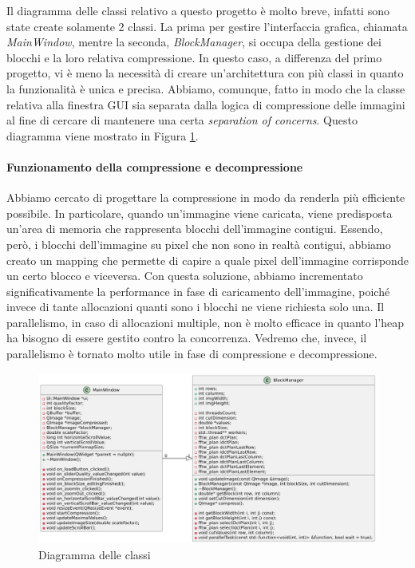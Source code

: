 Il diagramma delle classi relativo a questo progetto è molto breve, infatti sono state create solamente 2 classi. La prima per gestire l'interfaccia grafica, chiamata \textit{MainWindow}, mentre la seconda, \textit{BlockManager}, si occupa della gestione dei blocchi e la loro relativa compressione. In questo caso, a differenza del primo progetto, vi è meno la necessità di creare  un'architettura con più classi in quanto la funzionalità è unica e precisa. Abbiamo, comunque, fatto in modo che la classe relativa alla finestra GUI sia separata dalla logica di compressione delle immagini al fine di cercare di mantenere una certa \textit{separation of concerns}. Questo diagramma viene mostrato in Figura \ref{fig:class_diagram}.

\paragraph{Funzionamento della compressione e decompressione}
Abbiamo cercato di progettare la compressione in modo da renderla più efficiente possibile. In particolare, quando un'immagine viene caricata, viene predisposta un'area di memoria che rappresenta blocchi dell'immagine contigui. Essendo, però, i blocchi dell'immagine su pixel che non sono in realtà contigui, abbiamo creato un mapping che permette di capire a quale pixel dell'immagine corrisponde un certo blocco e viceversa. Con questa soluzione, abbiamo incrementato significativamente la performance in fase di caricamento dell'immagine, poiché invece di tante allocazioni quanti sono i blocchi ne viene richiesta solo una. Il parallelismo, in caso di allocazioni multiple, non è molto efficace in quanto l'heap ha bisogno di essere gestito contro la concorrenza. Vedremo che, invece, il parallelismo è tornato molto utile in fase di compressione e decompressione.

\begin{figure}[h]
	\centering
	\includegraphics[width=1\linewidth]{figures/class diagram}
	\caption{Diagramma delle classi}
	\label{fig:class_diagram}
\end{figure}

